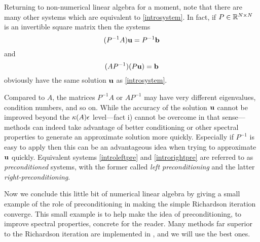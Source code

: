 Returning to non-numerical linear algebra for a moment, note that there are many other systems which are equivalent to \eqref{introsystem}.  In fact, if $P\in\mathbb{R}^{N\times N}$ is an invertible square matrix then the systems
\begin{equation}
(P^{-1} A) \mathbf{u} = P^{-1} \mathbf{b} \label{introleftpre}
\end{equation}
and
\begin{equation}
(A P^{-1}) (P\mathbf{u}) = \mathbf{b} \label{introrightpre}
\end{equation}
obviously have the same solution $\mathbf{u}$ as \eqref{introsystem}.

Compared to $A$, the matrices $P^{-1} A$ or $A P^{-1}$ may have very different eigenvalues, condition numbers, and so on.  While the accuracy of the solution $\mathbf{u}$ cannot be improved beyond the $\kappa(A) \epsilon$ level---fact i) cannot be overcome in that sense---methods can indeed take advantage of better conditioning or other spectral properties to generate an approximate solution more quickly.  Especially if $P^{-1}$ is easy to apply then this can be an advantageous idea when trying to approximate $\mathbf{u}$ quickly.  Equivalent systems \eqref{introleftpre} and \eqref{introrightpre} are referred to as \emph{preconditioned} systems, with the former called \emph{left preconditioning} and the latter \emph{right-preconditioning}.

Now we conclude this little bit of numerical linear algebra by giving a small example of the role of preconditioning in making the simple Richardson iteration converge.  This small example is to help make the idea of preconditioning, to improve spectral properties, concrete for the reader.  Many methods far superior to the Richardson iteration are implemented in \PETSc, and we will use the best ones.


